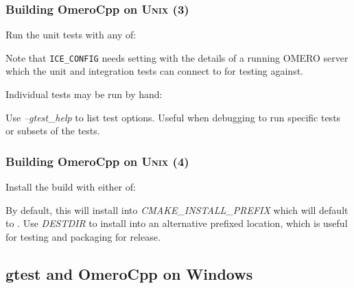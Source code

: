 \documentclass{beamer}
\newcommand{\env}[1]{\texttt{#1}}
\newcommand{\opt}[1]{\textsl{#1}}
\begin{document}
\begin{frame}[fragile]
  \frametitle{Building OmeroCpp on U\textsc{nix} (3)}
  \scriptsize

Run the unit tests with any of:

  \begin{semiverbatim}
\end{semiverbatim}

Note that \env{ICE\_CONFIG} needs setting with the details of a
running OMERO server which the unit and integration tests can connect
to for testing against.
\bigskip

Individual tests may be run by hand:

  \begin{semiverbatim}
\end{semiverbatim}

Use \opt{--gtest\_help} to list test options.  Useful when debugging
to run specific tests or subsets of the tests.
\end{frame}

\begin{frame}[fragile]
  \frametitle{Building OmeroCpp on U\textsc{nix} (4)}
  \scriptsize

Install the build with either of:

  \begin{semiverbatim}
\end{semiverbatim}

By default, this will install into \opt{CMAKE\_INSTALL\_PREFIX} which
will default to .  Use \opt{DESTDIR} to install into
an alternative prefixed location, which is useful for testing and
packaging for release.
\end{frame}

\subsection{gtest and OmeroCpp on Windows}
\end{document}

